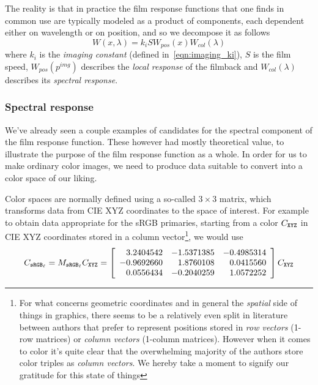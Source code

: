 The reality is that in practice the film response functions 
that one finds in common use are typically modeled as a product of
components, each dependent either on wavelength or on position, 
and so we decompose it as follows
\begin{equation}
W(x,\lambda) = k_i S W_{pos}(x) W_{col}(\lambda)
\end{equation}
where $k_i$ is the \textsl{imaging constant} (defined in~\cref{eqn:imaging_ki}), 
$S$ is the \gls{film speed},
$W_{pos}(p^{img})$ describes the \textsl{local response} of the filmback 
and
$W_{col}(\lambda)$ describes its \textsl{spectral response}.

\subsubsection{Spectral response}
We've already seen a couple examples of candidates for the spectral component
of the \gls{film response function}. These however had mostly theoretical value,
to illustrate the purpose of the film response function as a whole.
In order for us to make ordinary color images, we need to produce data
suitable to convert into a color space of our liking.

Color spaces are normally defined using a so-called $3\times3$ matrix, which
transforms data from \gls{CIE} \gls{XYZ} coordinates to the space of interest. 
For example to obtain data appropriate for the \gls{sRGB} primaries, starting from
a color $C_{\texttt{XYZ}}$ in \gls{CIE} \gls{XYZ} coordinates stored in a column vector\footnote{
	For what concerns geometric coordinates and in general the \emph{spatial} side of things
	in graphics, there seems to be a relatively even split in literature between authors that prefer 
	to represent positions stored in \textsl{row vectors} (1-row matrices) 
	or \textsl{column vectors} (1-column matrices).
	However when it comes to color it's quite clear that the overwhelming majority of the authors
	store color triples as \textsl{column vectors}. 
	We hereby take a moment to signify our gratitude for this state of things
}, we would use
\begin{displaymath}
	C_{\sRGBl} = M_{\sRGBl} C_{\XYZ} = \left[\begin{array}{r@{.}lr@{.}lr@{.}l}
		3&2404542 & -1&5371385 & -0&4985314 \\
		-0&9692660 &  1&8760108 &  0&0415560 \\
		0&0556434 & -0&2040259 &  1&0572252 \\
	\end{array}\right] C_{\XYZ}
\end{displaymath}

